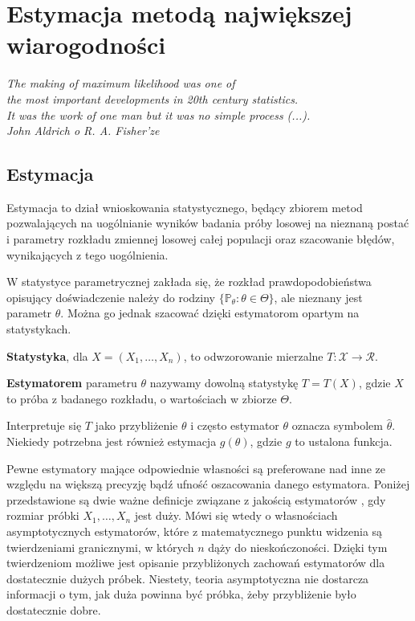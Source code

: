 \chapter{Estymacja metodą największej wiarogodności}\label{chap1}
\begin{flushright}
\textit{The making of maximum likelihood was one of \\
the most important developments in 20th century statistics. \\
It was the work of one man but it was no simple process (...). \\
John Aldrich o R. A. Fisher'ze
}
\end{flushright}

\section{Estymacja}

Estymacja to dział wnioskowania statystycznego, będący zbiorem metod pozwalających na uogólnianie wyników badania próby losowej na nieznaną postać i parametry rozkładu zmiennej losowej całej populacji oraz szacowanie błędów, wynikających z tego uogólnienia.

W statystyce parametrycznej zakłada się, że rozkład prawdopodobieństwa
opisujący doświadczenie należy do rodziny $\{\mathbb{P}_{\theta} : \theta \in \Theta\}$, ale nieznany jest
parametr $\theta$. Można go jednak szacować dzięki estymatorom opartym na statystykach.

\begin{definition}
\textbf{Statystyka}, dla $X=(X_1,\dots,X_n)$, to odwzorowanie mierzalne $T: \mathcal{X} \rightarrow \mathcal{R}.$
\end{definition}

\begin{definition}
\textbf{Estymatorem} parametru $\theta$ nazywamy dowolną statystykę
$T = T(X)$, gdzie $X$ to próba z badanego rozkładu, o wartościach w zbiorze $\Theta$. 
\end{definition}

Interpretuje się $T$ jako przybliżenie $\theta$ i często estymator $\theta$ oznacza symbolem $\hat{\theta}$. Niekiedy potrzebna jest również estymacja $g(\theta)$, gdzie $g$ to ustalona funkcja.

Pewne estymatory mające odpowiednie własności są preferowane nad inne ze względu na większą precyzję bądź ufność oszacowania danego estymatora. Poniżej przedstawione są dwie ważne definicje związane z jakością estymatorów \citep{niemiro}, gdy rozmiar próbki $X_1, \dots , X_n$ jest duży. Mówi się wtedy o własnościach asymptotycznych estymatorów, które z matematycznego punktu widzenia są twierdzeniami
granicznymi, w których $n$ dąży do nieskończoności. Dzięki tym twierdzeniom możliwe jest opisanie przybliżonych zachowań estymatorów dla dostatecznie dużych próbek. Niestety, teoria asymptotyczna nie dostarcza informacji o tym, jak duża powinna być próbka, żeby przybliżenie było dostatecznie dobre.

